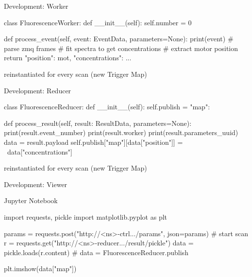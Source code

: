 \documentclass[aspectratio=169]{beamer}
\begin{document}
\begin{frame}[fragile]{Development: Worker}
  \begin{python}
class FluorescenceWorker:
    def __init__(self):
        self.number = 0
    
    def process_event(self, event: EventData,
                      parameters=None):
        print(event)
        # parse zmq frames
        # fit spectra to get concentrations
        # extract motor position
        return {"position": mot, "concentrations": ...}
\end{python}
 
reinstantiated for every scan (new Trigger Map)
\end{frame}

\begin{frame}[fragile]{Development: Reducer}
 \begin{python}
class FluorescenceReducer:
    def __init__(self):
        self.publish = {"map": {}}
    
    def process_result(self, 
                      result: ResultData, 
                      parameters=None):
        print(result.event_number)
        print(result.worker)
        print(result.parameters_uuid)
        data = result.payload
        self.publish["map"][data["position"]] = \
                data["concentrations"]
\end{python}

reinstantiated for every scan (new Trigger Map)

\end{frame}

\begin{frame}[fragile]{Development: Viewer}
 \begin{block}{Jupyter Notebook}
  \begin{python}
import requests, pickle
import matplotlib.pyplot as plt

params = {}
requests.post("http://<ns>-ctrl.../params", json=params)
# start scan
r = requests.get("http://<ns>-reducer.../result/pickle")
data = pickle.loads(r.content)
# data = FluorescenceReducer.publish

plt.imshow(data["map"])
  \end{python}

 \end{block}

\end{frame}
\end{document}
